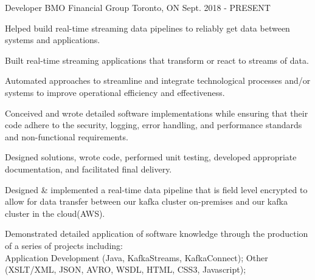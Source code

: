 


\begin{cventries}

\cventry
{Developer} %
{BMO Financial Group} %
{Toronto, ON} %
{Sept. 2018 - PRESENT} %
{ %
\begin{cvitems}
\item {Helped build real-time streaming data pipelines to reliably get data between systems and applications.}
\item {Built real-time streaming applications that transform or react to streams of data.}
\item {Automated approaches to streamline and integrate technological processes and/or systems to improve operational efficiency and effectiveness.}
\item {Conceived and wrote detailed software implementations while ensuring that their code adhere to the security, logging, error handling, and performance standards and non-functional requirements.}
\item {Designed solutions, wrote code, performed unit testing, developed appropriate documentation, and facilitated final delivery.}
\item {Designed \& implemented a real-time data pipeline that is field level encrypted to allow for data transfer between our kafka cluster on-premises and our kafka cluster in the cloud(AWS).}
\item {Demonstrated detailed application of software knowledge through the production of a series of projects including: \\Application Development (Java, KafkaStreams, KafkaConnect); Other (XSLT/XML, JSON, AVRO, WSDL, HTML, CSS3, Javascript);}
\end{cvitems}
}



\end{cventries}
